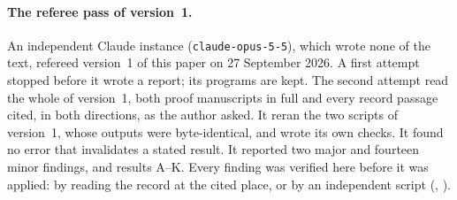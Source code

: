 \paragraph{The referee pass of version~1.}
An independent Claude instance (\texttt{claude-opus-5-5}), which wrote none of the text, refereed version~1 of this paper on 27 September 2026. A first attempt stopped before it wrote a report; its programs are kept. The second attempt read the whole of version~1, both proof manuscripts in full and every record passage cited, in both directions, as the author asked. It reran the two scripts of version~1, whose outputs were byte-identical, and wrote its own checks. It found no error that invalidates a stated result. It reported two major and fourteen minor findings, and results A--K. Every finding was verified here before it was applied: by reading the record at the cited place, or by an independent script (, ).
